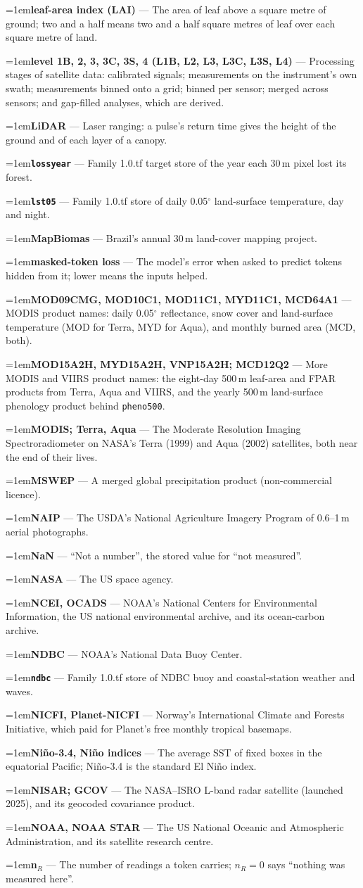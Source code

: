 \documentclass[10pt]{article}
\newcommand{\code}[1]{\texttt{#1}}
\newcommand{\gl}[2]{\par\hangindent=1em\hangafter=1\textbf{#1} --- #2\par}
\begin{document}
\gl{leaf-area index (LAI)}{The area of leaf above a square metre of ground; two and a half means two and a half square metres of leaf over each square metre of land.}
\gl{level 1B, 2, 3, 3C, 3S, 4 (L1B, L2, L3, L3C, L3S, L4)}{Processing stages of satellite data: calibrated signals; measurements on the instrument's own swath; measurements binned onto a grid; binned per sensor; merged across sensors; and gap-filled analyses, which are derived.}
\gl{LiDAR}{Laser ranging: a pulse's return time gives the height of the ground and of each layer of a canopy.}
\gl{\code{lossyear}}{Family 1.0.tf target store of the year each 30\,m pixel lost its forest.}
\gl{\code{lst05}}{Family 1.0.tf store of daily 0.05$^\circ$ land-surface temperature, day and night.}
\gl{MapBiomas}{Brazil's annual 30\,m land-cover mapping project.}
\gl{masked-token loss}{The model's error when asked to predict tokens hidden from it; lower means the inputs helped.}
\gl{MOD09CMG, MOD10C1, MOD11C1, MYD11C1, MCD64A1}{MODIS product names: daily 0.05$^\circ$ reflectance, snow cover and land-surface temperature (MOD for Terra, MYD for Aqua), and monthly burned area (MCD, both).}
\gl{MOD15A2H, MYD15A2H, VNP15A2H; MCD12Q2}{More MODIS and VIIRS product names: the eight-day 500\,m leaf-area and FPAR products from Terra, Aqua and VIIRS, and the yearly 500\,m land-surface phenology product behind \code{pheno500}.}
\gl{MODIS; Terra, Aqua}{The Moderate Resolution Imaging Spectroradiometer on NASA's Terra (1999) and Aqua (2002) satellites, both near the end of their lives.}
\gl{MSWEP}{A merged global precipitation product (non-commercial licence).}
\gl{NAIP}{The USDA's National Agriculture Imagery Program of 0.6--1\,m aerial photographs.}
\gl{NaN}{``Not a number'', the stored value for ``not measured''.}
\gl{NASA}{The US space agency.}
\gl{NCEI, OCADS}{NOAA's National Centers for Environmental Information, the US national environmental archive, and its ocean-carbon archive.}
\gl{NDBC}{NOAA's National Data Buoy Center.}
\gl{\code{ndbc}}{Family 1.0.tf store of NDBC buoy and coastal-station weather and waves.}
\gl{NICFI, Planet-NICFI}{Norway's International Climate and Forests Initiative, which paid for Planet's free monthly tropical basemaps.}
\gl{Ni\~no-3.4, Ni\~no indices}{The average SST of fixed boxes in the equatorial Pacific; Ni\~no-3.4 is the standard El Ni\~no index.}
\gl{NISAR; GCOV}{The NASA--ISRO L-band radar satellite (launched 2025), and its geocoded covariance product.}
\gl{NOAA, NOAA STAR}{The US National Oceanic and Atmospheric Administration, and its satellite research centre.}
\gl{n$_R$}{The number of readings a token carries; $n_R = 0$ says ``nothing was measured here''.}
\end{document}
